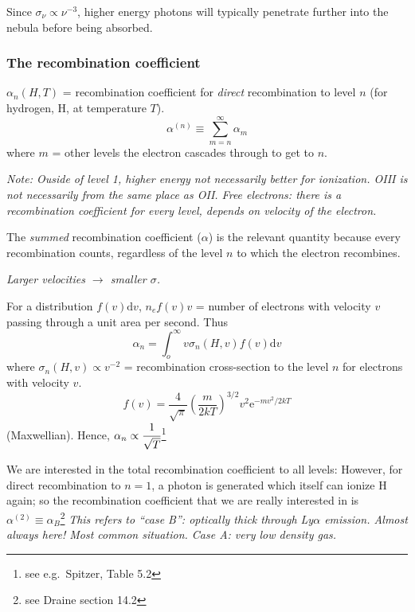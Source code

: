 \documentclass[11pt]{article}
\newcommand{\mar}[1]{\hspace{0pt}\marginpar{-\textcolor{black}{#1}-}}
\newcommand{\mynotes}[1]{{\fontfamily{cmss}\selectfont \textit{#1}}}
\begin{document}
Since $\sigma_{\nu} \propto \nu^{-3}$, higher energy photons will
typically penetrate further into the nebula before being absorbed.

\subsubsection{The recombination coefficient}\label{alpha}
$\alpha_{n}(H,T)$ = recombination coefficient for \emph{direct} recombination
to level $n$ (for hydrogen, H, at temperature $T$).
\[
    \alpha^{(n)} \equiv \sum_{m=n}^{\infty}{\alpha_{m}}
    \]
where $m$ = other levels the electron cascades through to get to $n$.

\mynotes{Note: Ouside of level 1, higher energy not necessarily better
for ionization. OIII is not necessarily from the same place as OII.
Free electrons: there is a recombination coefficient for every level,
depends on velocity of the electron.}

\mar{55}The \emph{summed} recombination coefficient ($\alpha$) is the relevant
quantity because every recombination counts, regardless of the level $n$ to
which the electron recombines.

\mynotes{Larger velocities $\rightarrow$ smaller $\sigma$.}

For a distribution $f(v)\mathrm{d}v$, $n_{e}f(v)v$ = number of electrons
with velocity $v$ passing through a unit area per second. Thus
\[
    \alpha_{n} = \int_{o}^{\infty}{v\sigma_{n}(H,v)f(v)\mathrm{d}v}
    \]
where $\sigma_{n}(H,v) \propto v^{-2}$ = recombination cross-section to the level
$n$ for electrons with velocity $v$.
\[
    f(v) = \frac{4}{\sqrt{\pi}}\left(\frac{m}{2kT}
    \right)^{3/2}v^{2}\mathrm{e}^{-mv^{2}/2kT}
    \]
(Maxwellian). Hence, $\alpha_{n} \propto \cfrac{1}{\sqrt{T}}$\footnote{see e.g.\
Spitzer, Table 5.2}

We are interested in the total recombination coefficient to all levels:
However, for direct recombination
to $ n=1 $, a photon is generated which itself can ionize H again; so the
recombination coefficient that we are really interested in is
$\alpha^{(2)} \equiv \alpha_{B}$\footnote{see Draine section 14.2}
\mynotes{This refers to ``case B'': optically thick through Ly$\alpha$
emission. Almost always here! Most common situation. Case A: very low
density gas.}
\end{document}
